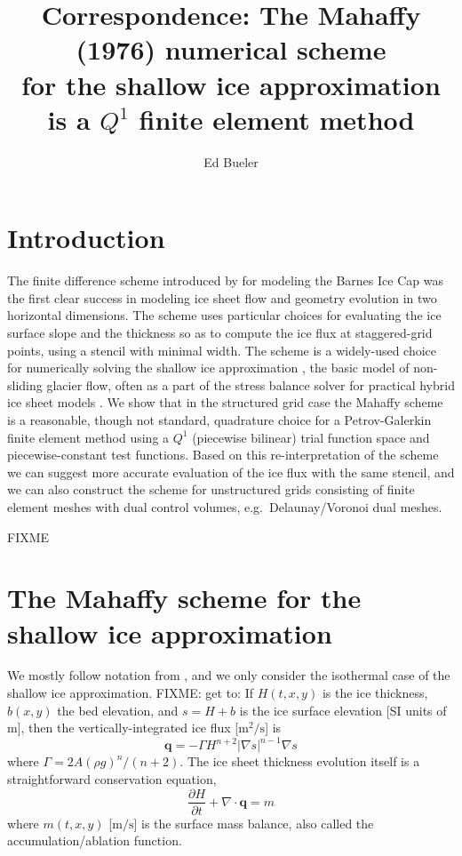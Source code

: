 \documentclass[11pt]{amsart}
\title{Correspondence: The Mahaffy (1976) numerical scheme \\ for the shallow ice approximation \\ is a $Q^1$ finite element method}
\author{Ed Bueler}
\newcommand\bq{\mathbf{q}}
\newcommand{\Div}{\nabla\cdot}
\newcommand{\grad}{\nabla}
\begin{document}

\maketitle

\thispagestyle{empty}


\section{Introduction}

The finite difference scheme introduced by \cite{Mahaffy1976} for modeling the Barnes Ice Cap was the first clear success in modeling ice sheet flow and geometry evolution in two horizontal dimensions.  The scheme uses particular choices for evaluating the ice surface slope and the thickness so as to compute the ice flux at staggered-grid points, using a stencil with minimal width.  The scheme is a widely-used choice for numerically solving the shallow ice approximation \cite{vanderVeen2013}, the basic model of non-sliding glacier flow, often as a part of the stress balance solver for practical hybrid ice sheet models \cite{BuelerBrown2009}.  We show that in the structured grid case the Mahaffy scheme is a reasonable, though not standard, quadrature choice for a Petrov-Galerkin finite element method using a $Q^1$ (piecewise bilinear) trial function space and piecewise-constant test functions.  Based on this re-interpretation of the scheme we can suggest more accurate evaluation of the ice flux with the same stencil, and we can also construct the scheme for unstructured grids consisting of finite element meshes with dual control volumes, e.g.~Delaunay/Voronoi dual meshes.

FIXME

\section{The Mahaffy scheme for the shallow ice approximation}  We mostly follow notation from \cite{Bueleretal2005}, and we only consider the isothermal case of the shallow ice approximation.  FIXME: get to:  If $H(t,x,y)$ is the ice thickness, $b(x,y)$ the bed elevation, and $s = H+b$ is the ice surface elevation [SI units of m], then the vertically-integrated ice flux [$\text{m}^2/\text{s}$] is
\begin{equation}
\bq = - \Gamma H^{n+2} |\grad s|^{n-1} \grad s  \label{eq:siaflux}
\end{equation}
where $\Gamma = 2 A (\rho g)^n / (n+2)$.  The ice sheet thickness evolution itself is a straightforward conservation equation,
\begin{equation}
\frac{\partial H}{\partial t} + \Div \bq = m  \label{eq:siaevolution}
\end{equation}
where $m(t,x,y)$ [$\text{m}/\text{s}$] is the surface mass balance, also called the accumulation/ablation function.
\end{document}
